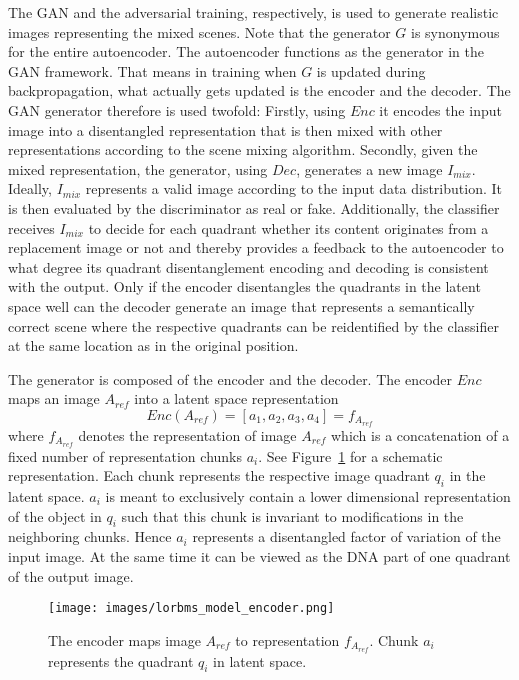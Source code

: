 \documentclass[a4paper,12pt]{report}
\begin{document}
The GAN and the adversarial training, respectively, is used to generate realistic images representing the mixed scenes. Note that the generator $G$ is synonymous for the entire autoencoder. The autoencoder functions as the generator in the GAN framework. That means in training when $G$ is updated during backpropagation, what actually gets updated is the encoder and the decoder. The GAN generator therefore is used twofold: Firstly, using $Enc$ it encodes the input image into a disentangled representation that is then mixed with other representations according to the scene mixing algorithm. Secondly, given the mixed representation, the generator, using $Dec$, generates a new image $I_{mix}$. Ideally, $I_{mix}$ represents a valid image according to the input data distribution. It is then evaluated by the discriminator as real or fake. Additionally, the classifier receives $I_{mix}$ to decide for each quadrant whether its content originates from a replacement image or not and thereby provides a feedback to the autoencoder to what degree its quadrant disentanglement encoding and decoding is consistent with the output. Only if the encoder disentangles the quadrants in the latent space well can the decoder generate an image that represents a semantically correct scene where the respective quadrants can be reidentified by the classifier at the same location as in the original position. 

The generator is composed of the encoder and the decoder. The encoder $Enc$ maps an image $A_{ref}$ into a latent space representation
\begin{equation} \label{eq:2}
    Enc(A_{ref}) = [a_1, a_2, a_3, a_4] = f_{A_{ref}}
\end{equation}
where $f_{A_{ref}}$ denotes the representation of image $A_{ref}$ which is a concatenation of a fixed number of representation chunks $a_i$. See Figure~\ref{fig:encoder} for a schematic representation. Each chunk represents the respective image quadrant $q_i$ in the latent space. $a_i$ is meant to exclusively contain a lower dimensional representation of the object in $q_i$ such that this chunk is invariant to modifications in the neighboring chunks. Hence $a_i$ represents a disentangled factor of variation of the input image. At the same time it can be viewed as the DNA part of one quadrant of the output image.

\begin{figure}[ht]
\centering
\texttt{[image: images/lorbms\_model\_encoder.png]}
\caption[Schematic of the encoder.]{The encoder maps image $A_{ref}$ to representation $f_{A_{ref}}$. Chunk $a_i$ represents the quadrant $q_i$ in latent space.}
\label{fig:encoder}
\end{figure}
\end{document}
